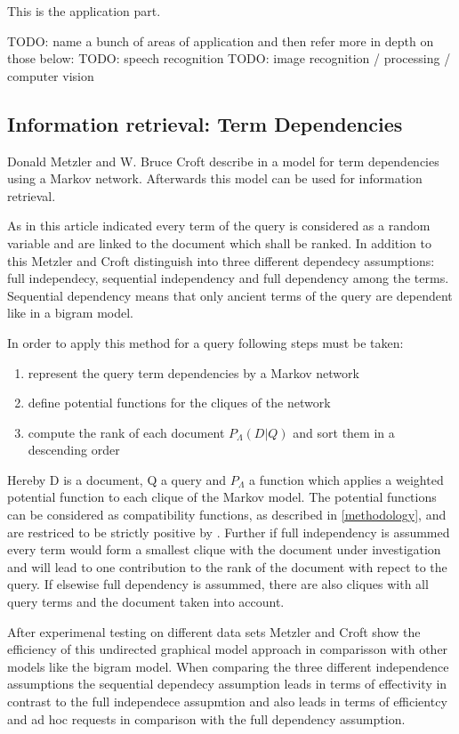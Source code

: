 This is the application part.

TODO: name a bunch of areas of application and then refer more in depth on those below:
TODO: speech recognition
TODO: image recognition / processing / computer vision \cite{li2009markov}

\subsection{Information retrieval: Term Dependencies}

Donald Metzler and W. Bruce Croft describe in \cite{metzler2005markov} a model for term dependencies using a Markov network. Afterwards this model can be used for information retrieval.

As in this article indicated every term of the query is considered as a random variable and are linked to the document which shall be ranked. In addition to this Metzler and Croft distinguish into three different dependecy assumptions: full independecy, sequential independency and full dependency among the terms. Sequential dependency means that only ancient terms of the query are dependent like in a bigram model.

In order to apply this method for a query following steps must be taken:
\begin{enumerate}
\item represent the query term dependencies by a Markov network
\item define potential functions for the cliques of the network
\item compute the rank of each document $P_\Lambda (D|Q)$ and sort them in a descending order
\end{enumerate}

Hereby D is a document, Q a query and $P_\Lambda$ a function which applies a weighted potential function to each clique of the Markov model. The potential functions can be considered as compatibility functions, as described in \ref{methodology}, and are restriced to be strictly positive by \cite{metzler20015markov}. Further if full independency is assummed every term would form a smallest clique with the document under investigation and will lead to one contribution to the rank of the document with repect to the query. If elsewise full dependency is assummed, there are also cliques with all query terms and the document taken into account.

After experimenal testing on different data sets Metzler and Croft show the efficiency of this undirected graphical model approach in comparisson with other models like the bigram model. When comparing the three different independence assumptions the sequential dependecy assumption leads in terms of effectivity in contrast to the full independece assupmtion and also leads in terms of efficientcy and ad hoc requests in comparison with the full dependency assumption.


